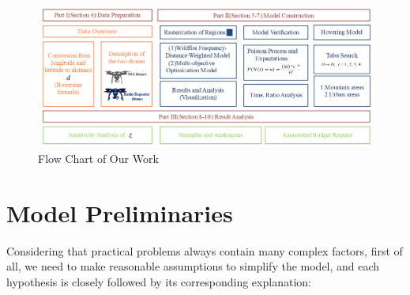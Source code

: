 \documentclass[12pt]{article}  %
\begin{document}
\begin{figure}[htbp]  %
	\centering  %
	\includegraphics[width=.9\textwidth]{Flow_Chart.png} %
	\caption{Flow Chart of Our Work} %
\end{figure}
\vspace{-0.8cm}



\section{Model Preliminaries}
Considering that practical problems always contain many complex factors, first of all, we need to make reasonable assumptions to simplify the model, and each hypothesis is closely followed by its corresponding explanation:
\end{document}
